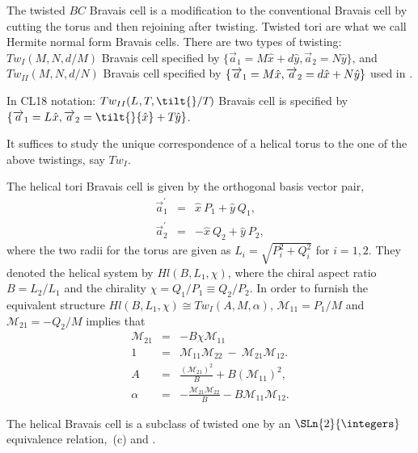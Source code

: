 \begin{description}
The twisted $BC$  Bravais cell is a modification to the
conventional Bravais cell by cutting the torus and then rejoining after twisting.
Twisted tori are what we call Hermite normal form Bravais cells.
There are two types of twisting: $Tw_{I}(M,N,d/M)$ Bravais cell specified by
 $\{\overrightarrow{a}_{1}=M{\hat{x}}+d{\hat{y}},%
\overrightarrow{a}_{2}=N{\hat{y}}\}$, and $Tw_{II}(M,N,d/N)$ Bravais cell
specified by $\{\overrightarrow{a}_{1}=M{\hat{x}},\overrightarrow{a}_{2}=d{%
\hat{x}}+N{\hat{y}}\}$ used in .

In CL18 notation:
$Tw_{II}(\speriod{},\period{},\tilt{}/\period{})$ Bravais cell is
specified by\\
$\{\overrightarrow{a}_{1}=\speriod{}{\hat{x}},
   \overrightarrow{a}_{2}=\tilt{}{\hat{x}}+\period{}{\hat{y}}\}$.

It suffices to study the
unique correspondence of a helical torus to the one of the above twistings,
say $Tw_{I}$.

The helical tori Bravais cell is given by the orthogonal basis vector pair,
\begin{eqnarray}
{\overrightarrow{a}}_{1}^{\prime } &=&{\hat{x}}\ P_{1}+{\hat{y}}\ Q_{1},
\nonumber \\
{\overrightarrow{a}}_{2}^{\prime } &=&-{\hat{x}}\ Q_{2}+{\hat{y}}\ P_{2},
\label{eq17}
\end{eqnarray}%
where the two radii for the torus are given as
$L_{i}=\sqrt{P_{i}^{2}+Q_{i}^{2}}$ for $i=1,2$. They denoted the helical
system by $Hl(B,L_{1},\chi)$, where the chiral aspect ratio
$B=L_{2}/L_{1}$ and the chirality $\chi =Q_{1}/P_{1}\equiv{Q}_{2}/P_{2}$.
In order to furnish the equivalent structure
$Hl(B,L_{1},\chi)\cong{Tw}_{I}(A,M,\alpha )$,
$\mathcal{M}_{11}={P_{1}}/{M}$ and $\mathcal{M}_{21}=-{Q_{2}}/M$ implies
that
\begin{eqnarray}
\mathcal{M}_{21} &=&-B\chi \mathcal{M}_{11}  \label{eq17_1} \\
1 &=&\mathcal{M}_{11}\mathcal{M}_{22}\ -\ \mathcal{M}_{21}\mathcal{M}_{12}.
\label{eq18} \\
A &=&\frac{\left( \mathcal{M}_{21}\right) ^{2}}{B}+B\left( \mathcal{M}%
_{11}\right) ^{2},  \label{eq19} \\
\alpha &=&-\frac{\mathcal{M}_{21}\mathcal{M}_{22}}{B}-B\mathcal{M}_{11}%
\mathcal{M}_{12}.  \label{eq20}
\end{eqnarray}%

The helical Bravais cell is a subclass of twisted one
by an $\SLn{2}{\integers}$ equivalence relation, \,(c)
and .


\end{description}

